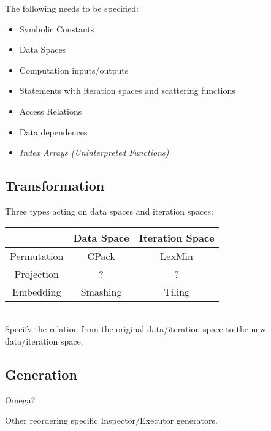 \documentclass[t,handout]{beamer}
\begin{document}
\begin{frame}
\LARGE
The following needs to be specified:
\begin{itemize}
\item Symbolic Constants
\item Data Spaces
\item Computation inputs/outputs
\item Statements with iteration spaces and scattering functions
\item Access Relations
\item Data dependences
\item \emph{Index Arrays (Uninterpreted Functions)}
\end{itemize}
\end{frame}

\subsection{Transformation}
\begin{frame}
Three types acting on data spaces and iteration spaces:
\bigskip{}
\begin{tabular}{|c||c|c|}
\hline 
 & Data Space & Iteration Space\tabularnewline
\hline 
Permutation & CPack & LexMin\tabularnewline
\hline 
Projection & ? & ?\tabularnewline
\hline 
Embedding & Smashing & Tiling\tabularnewline
\hline
\end{tabular}\\
\bigskip{}
Specify the relation from the original data/iteration space to the new data/iteration space.
\end{frame}

\subsection{Generation}
\begin{frame}
Omega?

Other reordering specific Inspector/Executor generators.
\end{frame}
\end{document}
